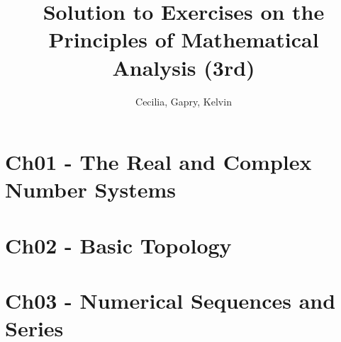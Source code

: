 \documentclass{article}
\title{Solution to Exercises on the \\Principles of Mathematical Analysis (3rd)}
\author{Cecilia, Gapry, Kelvin}
\begin{document}
\maketitle

\section*{Ch01 - The Real and Complex Number Systems}

\section*{Ch02 - Basic Topology}

\section*{Ch03 - Numerical Sequences and Series}
\end{document}
